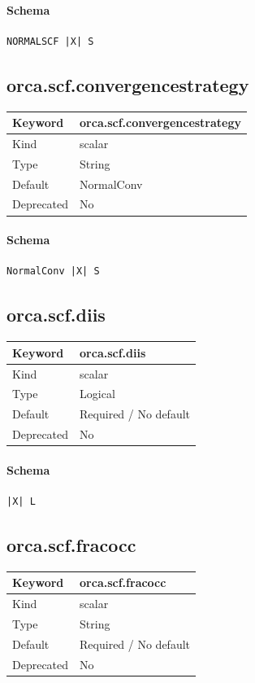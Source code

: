 \documentclass[11pt]{article}
\begin{document}
{{{{{\paragraph{Schema}
\begin{Verbatim}
NORMALSCF |X| S
\end{Verbatim}

\subsection{orca.scf.convergencestrategy}
\label{kw:orca-scf-convergencestrategy}
\begin{longtable}{|p{1.5in}|p{4.5in}|}
\hline
Keyword & orca.scf.convergencestrategy \\
\hline
Kind & scalar \\
\hline
Type & String \\
\hline
Default & NormalConv \\
\hline
Deprecated & No \\
\hline
\end{longtable}
\paragraph{Schema}
\begin{Verbatim}
NormalConv |X| S
\end{Verbatim}

\subsection{orca.scf.diis}
\label{kw:orca-scf-diis}
\begin{longtable}{|p{1.5in}|p{4.5in}|}
\hline
Keyword & orca.scf.diis \\
\hline
Kind & scalar \\
\hline
Type & Logical \\
\hline
Default & Required / No default \\
\hline
Deprecated & No \\
\hline
\end{longtable}
\paragraph{Schema}
\begin{Verbatim}
|X| L
\end{Verbatim}

\subsection{orca.scf.fracocc}
\label{kw:orca-scf-fracocc}
\begin{longtable}{|p{1.5in}|p{4.5in}|}
\hline
Keyword & orca.scf.fracocc \\
\hline
Kind & scalar \\
\hline
Type & String \\
\hline
Default & Required / No default \\
\hline
Deprecated & No \\
\hline
\end{longtable}
}}}}}
\end{document}
